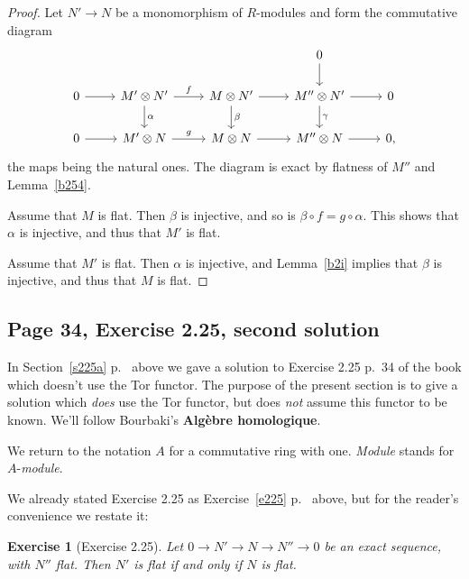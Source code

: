 \documentclass[parskip=half,fontsize=12pt]{scrartcl}%
\newtheorem{exo}[thm]{Exercise}
\begin{document}
\begin{proof}
Let $N'\to N$ be a monomorphism of $R$-modules and form the commutative diagram 
$$
\begin{tikzcd}
&&&0\ar[d]\\ 
0\ar[r]&M'\otimes N'\ar[d,"\alpha"]\ar[r,"f"]&M\otimes N'\ar[d,"\beta"]\ar[r]&M''\otimes N'\ar[d,"\gamma"]\ar[r]&0\\ 
0\ar[r]&M'\otimes N\ar[r,"g"]&M\otimes N\ar[r]&M''\otimes N\ar[r]&0,
\end{tikzcd}
$$ 
the maps being the natural ones. The diagram is exact by flatness of $M''$ and Lemma~\ref{b254}.

Assume that $M$ is flat. Then $\beta$ is injective, and so is $\beta\circ f=g\circ\alpha$. This shows that $\alpha$ is injective, and thus that $M'$ is flat.

Assume that $M'$ is flat. Then $\alpha$ is injective, and Lemma~\ref{b2i} implies that $\beta$ is injective, and thus that $M$ is flat.
\end{proof}

\subsection{Page 34, Exercise 2.25, second solution}\label{sol2}%

In Section~\ref{s225a} p.~\pageref{s225a} above we gave a solution to Exercise 2.25 p.~34 of the book which doesn't use the Tor functor. The purpose of the present section is to give a solution which \emph{does} use the Tor functor, but does \emph{not} assume this functor to be known. We'll follow Bourbaki's \textbf{Algèbre homologique}.

We return to the notation $A$ for a commutative ring with one. \emph{Module} stands for $A$-\emph{module}. 

We already stated Exercise 2.25 as Exercise~\ref{e225} p.~\pageref{e225} above, but for the reader's convenience we restate it:

\begin{exo}[Exercise 2.25]\label{e225b}
Let $0\to N'\to N\to N''\to0$ be an exact sequence, with $N''$ flat. Then $N'$ is flat if and only if $N$ is flat.
\end{exo}

\end{document}
